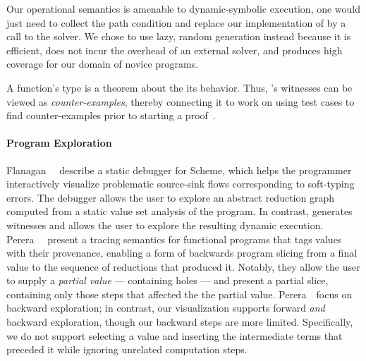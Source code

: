 Our operational semantics is amenable to dynamic-symbolic execution, one
would just need to collect the path condition and replace our
implementation of \gensym by a call to the solver. We chose to use lazy,
random generation instead because it is efficient, does not incur
the overhead of an external solver, and produces high coverage for our
domain of novice programs.

A function's type is a theorem about the its behavior.
Thus, \toolname's witnesses can be viewed as \emph{counter-examples},
thereby connecting it to work on using test cases to find
counter-examples prior to starting a proof~\cite{ACL2Testing, Seidel15}.


\paragraph{Program Exploration}

Flanagan~\etal~\citealt{Flanagan96} describe a static debugger for Scheme, which helps
the programmer interactively visualize problematic source-sink flows
corresponding to soft-typing errors. The debugger allows the user to explore
an abstract reduction graph computed from a static value set analysis of
the program. In contrast, \toolname generates witnesses and allows the user
to explore the resulting dynamic execution.
%
Perera~\etal~\citealt{Perera2012-dy} present a tracing semantics
for functional programs that tags values with their provenance, enabling
a form of backwards program slicing from a final value to the sequence
of reductions that produced it. Notably, they allow the user to supply a
\emph{partial value} --- containing holes --- and present a partial slice,
containing only those steps that affected the the partial value.
Perera~\etal\ focus on backward exploration; in contrast, our
visualization supports forward \emph{and} backward exploration, though
our backward steps are more limited.
%
Specifically, we do not support selecting a value and inserting the
intermediate terms that preceded it while ignoring unrelated computation
steps. %


